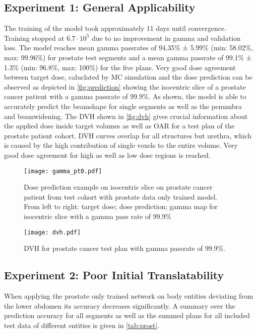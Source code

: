 \subsection{Experiment 1: General Applicability}

The training of the model took approximately 11 days until convergence. 
Training stopped at $6.7\cdot10^5$ due to no improvement in gamma and validation loss. 
The model reaches mean gamma passrates of 94.35\% ± 5.99\% (min: 58.02\%, max: 99.96\%) for prostate test segments and a mean gamma passrate of 99.1\% ± 1.3\% (min: 96.8\%, max: 100\%) for the five plans.
Very good dose agreement between target dose, caluclated by \acs{MC} simulation and the dose prediction can be observed as depicted in \autoref{fig:prediction} showing the isocentric slice of a prostate cancer patient with a gamma passrate of 99.9\%.
As shown, the model is able to accurately predict the beamshape for single segments as well as the penumbra and beamwidening. 
The \ac{DVH} shown in \autoref{fig:dvh} gives crucial information about the applied dose inside target volumes as well as \ac{OAR} for a test plan of the prostate patient cohort.
\acs{DVH} curves overlap for all structures but urethra, which is caused by the high contribution of single voxels to the entire volume. 
Very good dose agreement for high as well as low dose regions is reached. 

\begin{figure}[htb]
    \centering
    \texttt{[image: gamma\_pt0.pdf]}
    \caption{
        Dose prediction example on isocentric slice on prostate cancer patient from test cohort with prostate data only trained model. 
        From left to right: target dose; dose prediction; gamma map for isocentric slice with a gamma pass rate of 99.9\%
    }\label{fig:prediction}
\end{figure}

\begin{figure}
    \centering
    \texttt{[image: dvh.pdf]}
    \caption{\acs{DVH} for prostate cancer test plan with gamma passrate of 99.9\%.}\label{fig:dvh}
\end{figure}

\subsection{Experiment 2: Poor Initial Translatability}

When applying the prostate only trained network on body entities deviating from the lower abdomen its accuracy decreases significantly. 
A summary over the prediction accuracy for all segments as well as the summed plans for all included test data of different entities is given in \autoref{tab:prost}. 

